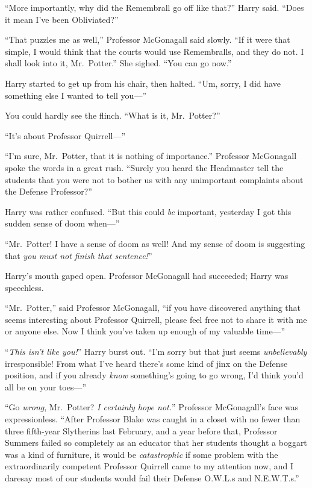 “More importantly, why did the Remembrall go off like that?” Harry said. “Does it mean I’ve been Obliviated?”

 “That puzzles me as well,” Professor McGonagall said slowly. “If it were that simple, I would think that the courts would use Remembralls, and they do not. I shall look into it, Mr.~Potter.” She sighed. “You can go now.”

Harry started to get up from his chair, then halted. “Um, sorry, I did have something else I wanted to tell you—”

You could hardly see the flinch. “What is it, Mr.~Potter?”

“It’s about Professor Quirrell—”

“I’m sure, Mr.~Potter, that it is nothing of importance.” Professor McGonagall spoke the words in a great rush. “Surely you heard the Headmaster tell the students that you were not to bother us with any unimportant complaints about the Defense Professor?”

Harry was rather confused. “But this could \emph{be} important, yesterday I got this sudden sense of doom when—”

“Mr.~Potter! I have a sense of doom as well! And my sense of doom is suggesting that \emph{you must not finish that sentence!}”

Harry’s mouth gaped open. Professor McGonagall had succeeded; Harry was speechless.

“Mr.~Potter,” said Professor McGonagall, “if you have discovered anything that seems interesting about Professor Quirrell, please feel free not to share it with me or anyone else. Now I think you’ve taken up enough of my valuable time—”

“\emph{This isn’t like you!}” Harry burst out. “I’m sorry but that just seems \emph{unbelievably} irresponsible! From what I’ve heard there’s some kind of jinx on the Defense position, and if you already \emph{know} something’s going to go wrong, I’d think you’d all be on your toes—”

“Go \emph{wrong}, Mr.~Potter? \emph{I certainly hope not.}” Professor McGonagall’s face was expressionless. “After Professor Blake was caught in a closet with no fewer than three fifth-year Slytherins last February, and a year before that, Professor Summers failed so completely as an educator that her students thought a boggart was a kind of furniture, it would be \emph{catastrophic} if some problem with the extraordinarily competent Professor Quirrell came to my attention now, and I daresay most of our students would fail their Defense O.W.L.s and N.E.W.T.s.”

